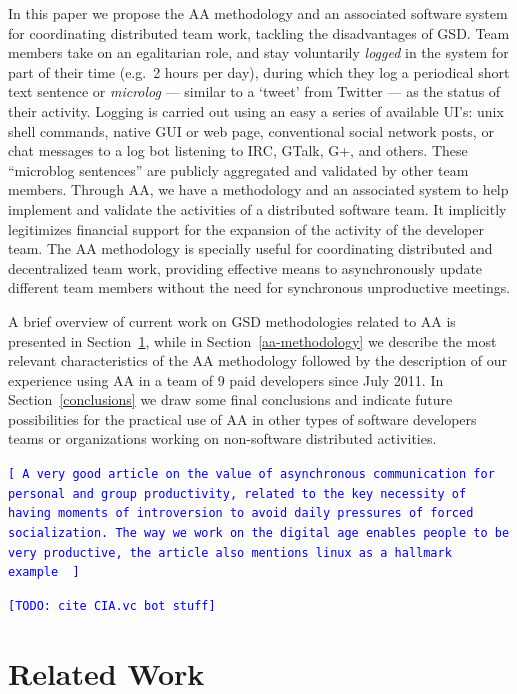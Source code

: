 \documentclass[letterpaper]{article}
\newcommand{\indraftnote}[1]{\textcolor{blue}{\texttt{\footnotesize[#1]}}}
\newcommand{\todo}[1]{\indraftnote{todo: #1}}
\begin{document}
In this paper we propose the AA methodology and an associated software system
for coordinating distributed team work, tackling the disadvantages
of GSD. Team members take on an egalitarian role, and stay
voluntarily \textit{logged} in the system for part of their time
(e.g.\ 2 hours per day), during which they log a periodical short text
sentence or \emph{microlog} --- similar to a `tweet' from Twitter --- as the
status of their activity. Logging is carried out using an easy a series of
available UI's: unix shell
commands, native GUI or web page, conventional social network posts, or chat messages to a log bot
listening to IRC, GTalk, G+, and others.  These ``microblog sentences'' are publicly aggregated and validated by other
team members. Through AA, we have a methodology and an associated system to help
implement and validate the activities of a distributed software team. It implicitly
legitimizes financial support for the expansion of the activity of the developer
team. The AA methodology is specially useful for coordinating distributed and
decentralized team work, providing effective means to asynchronously update
different team members without the need for synchronous unproductive meetings.


A brief overview of current work on GSD methodologies related to
AA is presented in Section~\ref{related-work}, while in
Section~\ref{aa-methodology} we describe the most relevant
characteristics of the AA methodology followed by the description of
our experience using AA in a team of 9 paid developers 
since July 2011. In Section~\ref{conclusions} we draw some final
conclusions and indicate future possibilities for the
practical use of AA in other types of software developers teams or
organizations working on non-software distributed activities.

\indraftnote{
A very good article on the value of asynchronous communication for personal
and group productivity, related to the key necessity of having moments of
introversion to avoid daily pressures of forced socialization. The way we work
on the digital age enables people to be very productive, the article also
mentions linux as a hallmark example~\cite{Thompson:Wired:2012}
}

\indraftnote{TODO: cite CIA.vc bot stuff}

\section{Related Work}
\label{related-work}
\end{document}
